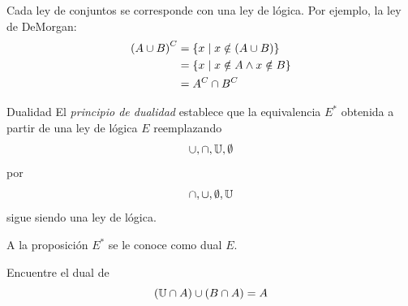 	Cada ley de conjuntos se corresponde con una ley de lógica. Por ejemplo, la ley de DeMorgan:
	\begin{align*}
		\left(A \cup B\right)^{C} &= \left\{ x \mid x\notin(A \cup B) \right\}\\
		&= \left\{ x \mid x\notin A \wedge x\notin B \right\}\\
		&=A^{C}\cap B^{C}
	\end{align*}



	{Dualidad}
	El \emph{principio de dualidad} establece que la equivalencia $E^{*}$ obtenida a partir de una ley de lógica $E$ reemplazando
	\[ \cup, \cap, \mathbb{U}, \emptyset\] por
	\[ \cap, \cup, \emptyset, \mathbb{U}\]
	sigue siendo una ley de lógica.
	
	
	A la proposición $E^{*}$ se le conoce como dual $E.$



	\begin{problema}
		Encuentre el dual de 
		\[ (\mathbb{U} \cap A) \cup (B\cap A) = A\]
	\end{problema}


